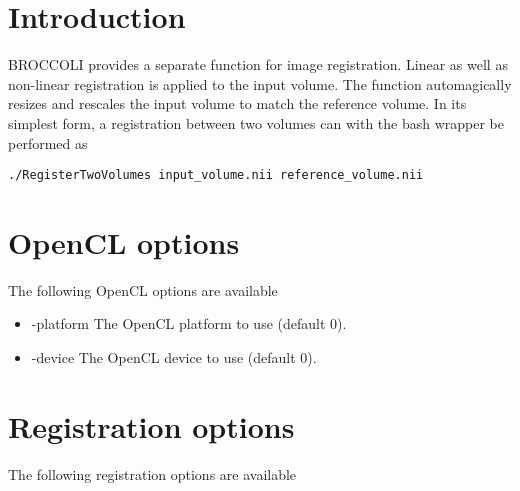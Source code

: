 \section{Introduction}

BROCCOLI provides a separate function for image registration. Linear as well as non-linear registration is applied to the input volume. The function automagically resizes and rescales the input volume to match the reference volume. In its simplest form, a registration between two volumes can with the bash wrapper be performed as

\begin{verbatim}
./RegisterTwoVolumes input_volume.nii reference_volume.nii
\end{verbatim}

\section{OpenCL options}

The following OpenCL options are available

\begin{itemize}

\item -platform
\newline \newline The OpenCL platform to use (default 0).

\item -device
\newline \newline The OpenCL device to use (default 0).

\end{itemize}

\section{Registration options}

The following registration options are available

